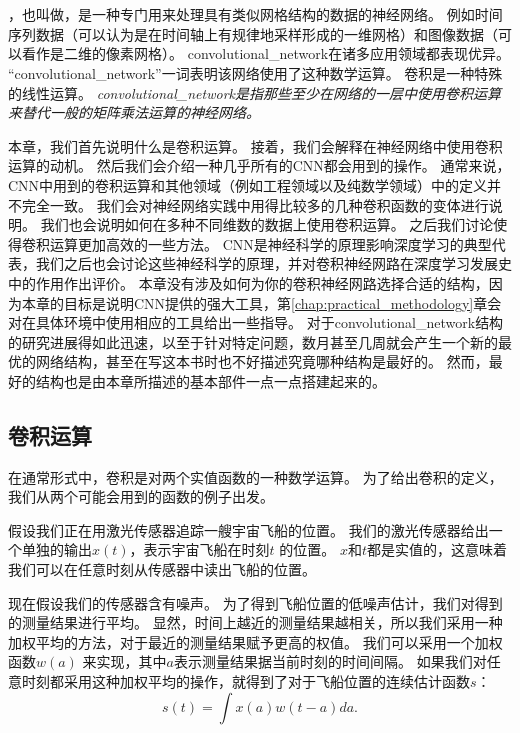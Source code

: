 \chapter{}
\label{chap:convolutional_networks}

\citep{LeCun89a}，也叫做，是一种专门用来处理具有类似网格结构的数据的神经网络。
例如时间序列数据（可以认为是在时间轴上有规律地采样形成的一维网格）和图像数据（可以看作是二维的像素网格）。
\gls{convolutional_network}在诸多应用领域都表现优异。
``\gls{convolutional_network}''一词表明该网络使用了这种数学运算。
卷积是一种特殊的线性运算。
\emph{\gls{convolutional_network}是指那些至少在网络的一层中使用卷积运算来替代一般的矩阵乘法运算的神经网络。}

本章，我们首先说明什么是卷积运算。
接着，我们会解释在神经网络中使用卷积运算的动机。
然后我们会介绍一种几乎所有的\gls{CNN}都会用到的操作。
通常来说，\gls{CNN}中用到的卷积运算和其他领域（例如工程领域以及纯数学领域）中的定义并不完全一致。
我们会对神经网络实践中用得比较多的几种卷积函数的变体进行说明。
我们也会说明如何在多种不同维数的数据上使用卷积运算。
之后我们讨论使得卷积运算更加高效的一些方法。
\gls{CNN}是神经科学的原理影响深度学习的典型代表，我们之后也会讨论这些神经科学的原理，并对卷积神经网路在深度学习发展史中的作用作出评价。
本章没有涉及如何为你的卷积神经网路选择合适的结构，因为本章的目标是说明\gls{CNN}提供的强大工具，第\ref{chap:practical_methodology}章会对在具体环境中使用相应的工具给出一些指导。
对于\gls{convolutional_network}结构的研究进展得如此迅速，以至于针对特定问题，数月甚至几周就会产生一个新的最优的网络结构，甚至在写这本书时也不好描述究竟哪种结构是最好的。
然而，最好的结构也是由本章所描述的基本部件一点一点搭建起来的。

 
\section{卷积运算}
\label{sec:the_convolution_operation}

在通常形式中，卷积是对两个实值函数的一种数学运算。
为了给出卷积的定义，我们从两个可能会用到的函数的例子出发。

假设我们正在用激光传感器追踪一艘宇宙飞船的位置。
我们的激光传感器给出一个单独的输出$x(t)$，表示宇宙飞船在时刻$t$ 的位置。
$x$和$t$都是实值的，这意味着我们可以在任意时刻从传感器中读出飞船的位置。

现在假设我们的传感器含有噪声。
为了得到飞船位置的低噪声估计，我们对得到的测量结果进行平均。
显然，时间上越近的测量结果越相关，所以我们采用一种加权平均的方法，对于最近的测量结果赋予更高的权值。
我们可以采用一个加权函数$w(a)$ 来实现，其中$a$表示测量结果据当前时刻的时间间隔。
如果我们对任意时刻都采用这种加权平均的操作，就得到了对于飞船位置的连续估计函数$s$：
\begin{equation}
s(t) = \int x(a)w(t-a)da.
\end{equation}

